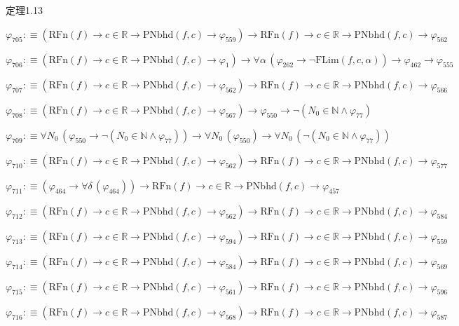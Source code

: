 \begin{fullproof}{定理1.13}
\begin{abbrevlist}
\item $\varphi_{705} :\equiv (\mathrm{RFn}(f) \to c \in \mathbb{R} \to \mathrm{PNbhd}(f,c) \to \varphi_{559}) \to \mathrm{RFn}(f) \to c \in \mathbb{R} \to \mathrm{PNbhd}(f,c) \to \varphi_{562}$
\item $\varphi_{706} :\equiv (\mathrm{RFn}(f) \to c \in \mathbb{R} \to \mathrm{PNbhd}(f,c) \to \varphi_{1}) \to \forall \alpha\,(\varphi_{262} \to \neg \mathrm{FLim}(f,c,\alpha)) \to \varphi_{462} \to \varphi_{555}$
\item $\varphi_{707} :\equiv (\mathrm{RFn}(f) \to c \in \mathbb{R} \to \mathrm{PNbhd}(f,c) \to \varphi_{562}) \to \mathrm{RFn}(f) \to c \in \mathbb{R} \to \mathrm{PNbhd}(f,c) \to \varphi_{566}$
\item $\varphi_{708} :\equiv (\mathrm{RFn}(f) \to c \in \mathbb{R} \to \mathrm{PNbhd}(f,c) \to \varphi_{567}) \to \varphi_{550} \to \neg (N_{0} \in \mathbb{N} \land \varphi_{77})$
\item $\varphi_{709} :\equiv \forall N_{0}\,(\varphi_{550} \to \neg (N_{0} \in \mathbb{N} \land \varphi_{77})) \to \forall N_{0}\,(\varphi_{550}) \to \forall N_{0}\,(\neg (N_{0} \in \mathbb{N} \land \varphi_{77}))$
\item $\varphi_{710} :\equiv (\mathrm{RFn}(f) \to c \in \mathbb{R} \to \mathrm{PNbhd}(f,c) \to \varphi_{562}) \to \mathrm{RFn}(f) \to c \in \mathbb{R} \to \mathrm{PNbhd}(f,c) \to \varphi_{577}$
\item $\varphi_{711} :\equiv (\varphi_{464} \to \forall \delta\,(\varphi_{464})) \to \mathrm{RFn}(f) \to c \in \mathbb{R} \to \mathrm{PNbhd}(f,c) \to \varphi_{457}$
\item $\varphi_{712} :\equiv (\mathrm{RFn}(f) \to c \in \mathbb{R} \to \mathrm{PNbhd}(f,c) \to \varphi_{562}) \to \mathrm{RFn}(f) \to c \in \mathbb{R} \to \mathrm{PNbhd}(f,c) \to \varphi_{584}$
\item $\varphi_{713} :\equiv (\mathrm{RFn}(f) \to c \in \mathbb{R} \to \mathrm{PNbhd}(f,c) \to \varphi_{594}) \to \mathrm{RFn}(f) \to c \in \mathbb{R} \to \mathrm{PNbhd}(f,c) \to \varphi_{559}$
\item $\varphi_{714} :\equiv (\mathrm{RFn}(f) \to c \in \mathbb{R} \to \mathrm{PNbhd}(f,c) \to \varphi_{584}) \to \mathrm{RFn}(f) \to c \in \mathbb{R} \to \mathrm{PNbhd}(f,c) \to \varphi_{569}$
\item $\varphi_{715} :\equiv (\mathrm{RFn}(f) \to c \in \mathbb{R} \to \mathrm{PNbhd}(f,c) \to \varphi_{561}) \to \mathrm{RFn}(f) \to c \in \mathbb{R} \to \mathrm{PNbhd}(f,c) \to \varphi_{596}$
\item $\varphi_{716} :\equiv (\mathrm{RFn}(f) \to c \in \mathbb{R} \to \mathrm{PNbhd}(f,c) \to \varphi_{568}) \to \mathrm{RFn}(f) \to c \in \mathbb{R} \to \mathrm{PNbhd}(f,c) \to \varphi_{587}$

\end{abbrevlist}
\end{fullproof}
